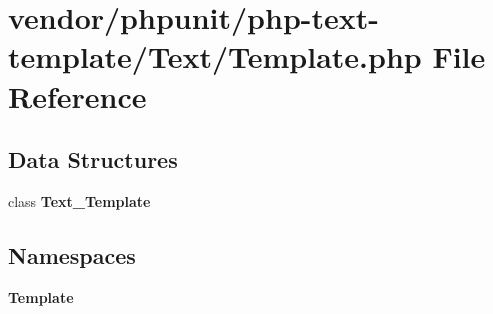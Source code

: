 \section{vendor/phpunit/php-\/text-\/template/\+Text/\+Template.php File Reference}
\label{phpunit_2php-text-template_2_text_2_template_8php}
\subsection*{Data Structures}
\begin{DoxyCompactItemize}
\item 
class {\bf Text\+\_\+\+Template}
\end{DoxyCompactItemize}
\subsection*{Namespaces}
\begin{DoxyCompactItemize}
\item 
 {\bf Template}
\end{DoxyCompactItemize}
